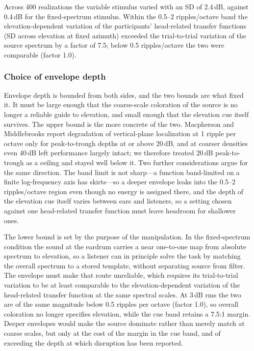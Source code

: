 Across 400 realizations the variable stimulus varied with an SD of 2.4\,dB,
against 0.4\,dB for the fixed-spectrum stimulus. Within the 0.5--2
ripples/octave band the elevation-dependent variation of the participants'
head-related transfer functions (SD across elevation at fixed azimuth) exceeded
the trial-to-trial variation of the source spectrum by a factor of 7.5; below
0.5 ripples/octave the two were comparable (factor 1.0).


\subsubsection*{Choice of envelope depth}

Envelope depth is bounded from both sides, and the two bounds are what fixed
it. It must be large enough that the coarse-scale coloration of the source is
no longer a reliable guide to elevation, and small enough that the elevation
cue itself survives. The upper bound is the more concrete of the two.
Macpherson and Middlebrooks
report degradation of vertical-plane localization at 1 ripple per octave only
for peak-to-trough depths at or above 20\,dB, and at coarser densities even
40\,dB left performance largely intact; we therefore treated 20\,dB
peak-to-trough as a ceiling and stayed well below it. Two further
considerations argue for the same direction. The band limit is not sharp---a
function band-limited on a finite log-frequency axis has skirts---so a deeper
envelope leaks into the 0.5--2 ripples/octave region even though no energy is
assigned there, and the depth of the elevation cue itself varies between ears
and listeners, so a setting chosen against one head-related transfer function
must leave headroom for shallower ones.

The lower bound is set by the purpose of the manipulation. In the fixed-spectrum
condition the sound at the eardrum carries a near one-to-one map from absolute
spectrum to elevation, so a listener can in principle solve the task by
matching the overall spectrum to a stored template, without separating source
from filter. The envelope must make that route unreliable, which requires its
trial-to-trial variation to be at least comparable to the elevation-dependent
variation of the head-related transfer function at the same spectral scales. At
3\,dB rms the two are of the same magnitude below 0.5 ripples per octave
(factor 1.0), so overall coloration no longer specifies elevation, while the
cue band retains a 7.5:1 margin. Deeper envelopes would make the source
dominate rather than merely match at coarse scales, but only at the cost of
the margin in the cue band, and of exceeding the depth at which disruption has
been reported.

